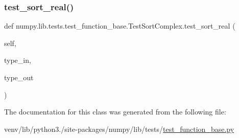 \mbox{\label{classnumpy_1_1lib_1_1tests_1_1test__function__base_1_1TestSortComplex_ac738f87f13bcccabfe0846fa8f04b6e1}} 
\subsubsection{\texorpdfstring{test\+\_\+sort\+\_\+real()}{test\_sort\_real()}}
{\footnotesize\ttfamily def numpy.\+lib.\+tests.\+test\+\_\+function\+\_\+base.\+Test\+Sort\+Complex.\+test\+\_\+sort\+\_\+real (\begin{DoxyParamCaption}\item[{}]{self,  }\item[{}]{type\+\_\+in,  }\item[{}]{type\+\_\+out }\end{DoxyParamCaption})}



The documentation for this class was generated from the following file\+:\begin{DoxyCompactItemize}
\item 
venv/lib/python3./site-\/packages/numpy/lib/tests/\hyperlink{lib_2tests_2test__function__base_8py}{test\+\_\+function\+\_\+base.\+py}\end{DoxyCompactItemize}
